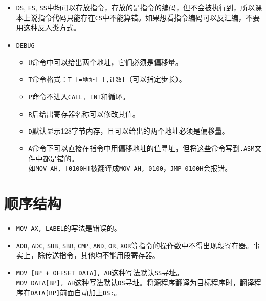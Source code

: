\documentclass{article}
\begin{document}
\begin{CJK*}{UTF8}{gbsn}
\begin{itemize}
\item
\verb|DS|, \verb|ES|, \verb|SS|中均可以存放指令，存放的是指令的编码，但不会被执行到，所以课本上说指令代码只能存在\verb|CS|中不能算错。如果想看指令编码可以反汇编，不要用这种反人类方式。 \\

\item
\verb|DEBUG|

\begin{itemize}
\item \verb|U|命令中可以给出两个地址，它们必须是偏移量。
\item \verb|T|命令格式：\verb|T [=地址] [,计数]|（可以指定步长）。
\item \verb|P|命令不进入\verb|CALL, INT|和循环。
\item \verb|R|后给出寄存器名称可以修改其值。
\item \verb|D|默认显示128字节内存，且可以给出的两个地址必须是偏移量。
\item \verb|A|命令下可以直接在指令中用偏移地址的值寻址，但将这些命令写到\verb|.ASM|文件中都是错的。 \\
如\verb|MOV AH, [0100H]|被翻译成\verb|MOV AH, 0100|，\verb|JMP 0100H|会报错。
\end{itemize}

\end{itemize}

\section{顺序结构}

\begin{itemize}

\item
\verb|MOV AX, LABEL|的写法是错误的。 \\

\item
\verb|ADD|, \verb|ADC|, \verb|SUB|, \verb|SBB|, \verb|CMP|, \verb|AND|, \verb|OR|, \verb|XOR|等指令的操作数中不得出现段寄存器。事实上，除传送指令，其他均不能用段寄存器。 \\

\item
\verb|MOV [BP + OFFSET DATA], AH|这种写法默认\verb|SS|寻址。 \\
\verb|MOV DATA[BP], AH|这种写法默认\verb|DS|寻址。将源程序翻译为目标程序时，翻译程序在\verb|DATA[BP]|前面自动加上\verb|DS:|。 \\


\end{itemize}
\end{CJK*}
\end{document}
